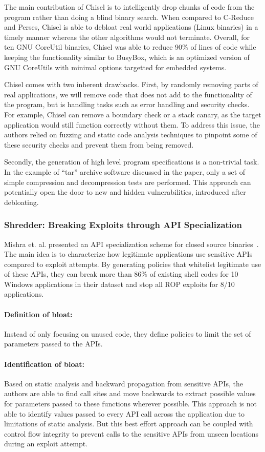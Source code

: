 The main contribution of Chisel is to intelligently drop chunks of code from the program rather than doing a blind binary search. When compared to C-Reduce and Perses, Chisel is able to debloat real world applications (Linux binaries) in a timely manner whereas the other algorithms would not terminate. Overall, for ten GNU CoreUtil binaries, Chisel was able to reduce 90\% of lines of code while keeping the functionality similar to BusyBox, which is an optimized version of GNU CoreUtils with minimal options targetted for embedded systems.

Chisel comes with two inherent drawbacks. First, by randomly removing parts of real applications, we will remove code that does not add to the functionality of the program, but is handling tasks such as error handling and security checks.
For example, Chisel can remove a boundary check or a stack canary, as the target application would still function correctly without them. To address this issue, the authors relied on fuzzing and static code analysis techniques to pinpoint some of these
security checks and prevent them from being removed.

Secondly, the generation of high level program specifications is a non-trivial task. In the example of ``tar'' archive software discussed in the paper, only a set of simple compression and decompression tests are performed. This approach can potentially open the door to new and hidden vulnerabilities, introduced after debloating.

\subsubsection{Shredder: Breaking Exploits through API Specialization}
Mishra et. al. presented an API specialization scheme for closed source binaries~\cite{mishra2018shredder}. The main idea is to characterize how legitimate applications use sensitive APIs compared to exploit attempts. By generating policies that
whitelist legitimate use of these APIs, they can break more than 86\% of existing shell codes for 10 Windows applications in their dataset and stop all ROP exploits for 8/10 applications.

\paragraph{Definition of bloat:} Instead of only focusing on unused code, they define policies to limit the set of parameters passed to the APIs.
\paragraph{Identification of bloat:} Based on static analysis and backward propagation from sensitive APIs, the authors are able to find call sites and move backwards to extract possible values for parameters passed to these functions wherever possible. This approach is not able to identify values passed to every API call across the application due to limitations of static analysis. But this best effort approach can be coupled with control flow integrity to prevent calls to the sensitive APIs from unseen locations during an exploit attempt.
